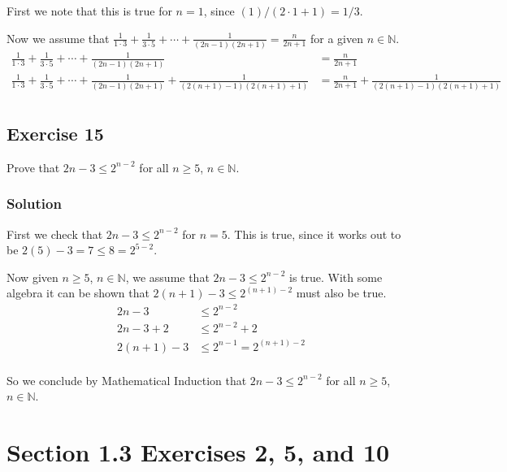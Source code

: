 \documentclass[12pt]{article}
\begin{document}
First we note that this is true for $n = 1$, since $\left(1\right)/\left(2 \cdot 1 + 1\right) = 1/3$.

Now we assume that $\frac{1}{1 \cdot 3} + \frac{1}{3 \cdot 5} + \cdots + \frac{1}{\left(2n - 1\right)\left(2n + 1\right)} = \frac{n}{2n + 1}$ for a given $n \in \mathbb{N}$.
\begin{align*}
\frac{1}{1 \cdot 3} + \frac{1}{3 \cdot 5} + \cdots + \frac{1}{\left(2n - 1\right)\left(2n + 1\right)} &= \frac{n}{2n + 1} \\
\frac{1}{1 \cdot 3} + \frac{1}{3 \cdot 5} + \cdots + \frac{1}{\left(2n - 1\right)\left(2n + 1\right)} + \frac{1}{\left(2\left(n + 1\right) - 1\right)\left(2\left(n + 1\right) + 1\right)} &= \frac{n}{2n + 1} + \frac{1}{\left(2\left(n + 1\right) - 1\right)\left(2\left(n + 1\right) + 1\right)} \\
\end{align*}

\subsection*{Exercise 15}
Prove that $2n - 3 \leq 2^{n-2}$ for all $n \geq 5$, $n \in \mathbb{N}$.
\subsubsection*{Solution}
First we check that $2n - 3 \leq 2^{n-2}$ for $n = 5$. This is true, since it works out to be $2(5) - 3 = 7 \leq 8 = 2^{5 - 2}$.

Now given $n \geq 5$, $n \in \mathbb{N}$, we assume that $2n - 3 \leq 2^{n-2}$ is true. With some algebra it can be shown that $2\left(n + 1\right) - 3 \leq 2^{\left(n + 1\right) - 2}$ must also be true.
\begin{align*}
2n - 3 &\leq 2^{n - 2} \\
2n - 3 + 2 &\leq 2^{n - 2} + 2 \\
2\left(n + 1\right) - 3 &\leq 2^{n - 1} = 2^{\left(n + 1\right) - 2} \\
\end{align*}

So we conclude by Mathematical Induction that $2n - 3 \leq 2^{n-2}$ for all $n \geq 5$, $n \in \mathbb{N}$.

\section*{Section 1.3 Exercises 2, 5, and 10}
\end{document}
